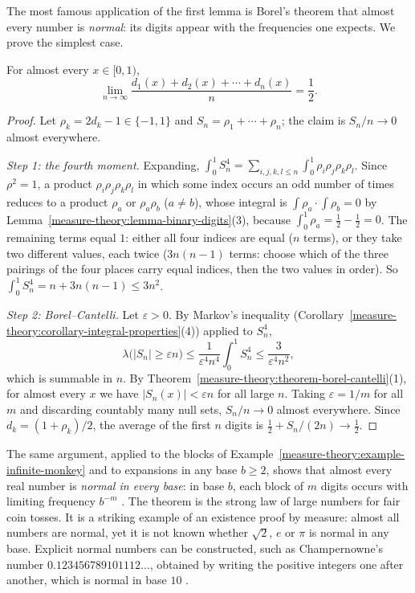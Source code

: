 The most famous application of the first lemma is Borel's theorem that almost every number is \emph{normal}: its digits appear with the frequencies one expects. We prove the simplest case.

\begin{theorem}\label{measure-theory:theorem-borel-normal}
For almost every $x \in [0, 1)$,
\[
\lim_{n \to \infty}\frac{d_1(x) + d_2(x) + \cdots + d_n(x)}{n} = \frac12 .
\]
\end{theorem}

\begin{proof}
Let $\rho_k = 2d_k - 1 \in \{-1, 1\}$ and $S_n = \rho_1 + \cdots + \rho_n$; the claim is $S_n/n \to 0$ almost everywhere.

\emph{Step 1: the fourth moment.} Expanding,
$\int_0^1S_n^4 = \sum_{i, j, k, l \leq n}\int_0^1\rho_i\rho_j\rho_k\rho_l$. Since $\rho^2 = 1$, a product $\rho_i\rho_j\rho_k\rho_l$ in which some index occurs an odd number of times reduces to a product
$\rho_a$ or $\rho_a\rho_b$ ($a \neq b$), whose integral is $\int\rho_a \cdot \int\rho_b = 0$ by Lemma~\ref{measure-theory:lemma-binary-digits}(3), because $\int_0^1\rho_a = \frac12 - \frac12 = 0$. The
remaining terms equal $1$: either all four indices are equal ($n$ terms), or they take two different values, each twice ($3n(n - 1)$ terms: choose which of the three pairings of the four places carry equal
indices, then the two values in order). So $\int_0^1S_n^4 = n + 3n(n - 1) \leq 3n^2$.

\emph{Step 2: Borel--Cantelli.} Let $\varepsilon > 0$. By Markov's inequality (Corollary~\ref{measure-theory:corollary-integral-properties}(4)) applied to $S_n^4$,
\[
\lambda\bigl(|S_n| \geq \varepsilon n\bigr) \leq \frac{1}{\varepsilon^4n^4}\int_0^1S_n^4 \leq \frac{3}{\varepsilon^4n^2},
\]
which is summable in $n$. By Theorem~\ref{measure-theory:theorem-borel-cantelli}(1), for almost every $x$ we have $|S_n(x)| < \varepsilon n$ for all large $n$. Taking $\varepsilon = 1/m$ for all $m$ and
discarding countably many null sets, $S_n/n \to 0$ almost everywhere. Since $d_k = (1 + \rho_k)/2$, the average of the first $n$ digits is $\frac12 + S_n/(2n) \to \frac12$.
\end{proof}

\begin{remark}\label{measure-theory:remark-normal-numbers}
The same argument, applied to the blocks of Example~\ref{measure-theory:example-infinite-monkey} and to expansions in any base $b \geq 2$, shows that almost every real number is \emph{normal in every base}:
in base $b$, each block of $m$ digits occurs with limiting frequency $b^{-m}$ \cite{borel-1909}. The theorem is the strong law of large numbers for fair coin tosses. It is a striking example of an
existence proof by measure: almost all numbers are normal, yet it is not known whether $\sqrt2$, $e$ or $\pi$ is normal in any base. Explicit normal numbers can be constructed, such as Champernowne's
number $0.123456789101112\ldots$, obtained by writing the positive integers one after another, which is normal in base $10$ \cite{champernowne-1933}.
\end{remark}

